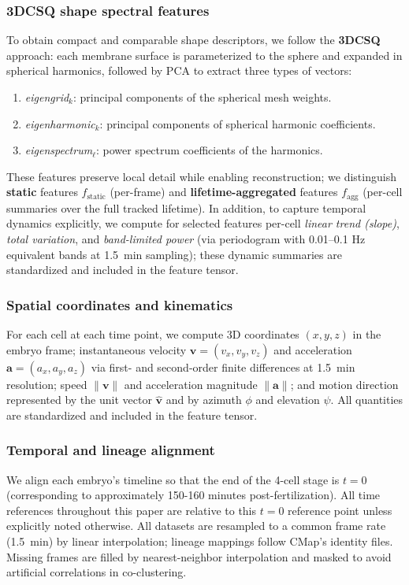 \documentclass[unnumsec,webpdf,modern,large,namedate]{oup-authoring-template}%
\theoremstyle{thmstyleone}\newtheorem{theorem}{Theorem}
\theoremstyle{thmstyletwo}\newtheorem{example}{Example}
\theoremstyle{thmstylethree}\newtheorem{definition}{Definition}
\begin{document}
\subsubsection{3DCSQ shape spectral features}
To obtain compact and comparable shape descriptors, we follow the \textbf{3DCSQ} approach: each membrane surface is parameterized to the sphere and expanded in spherical harmonics, followed by PCA to extract three types of vectors:
\begin{enumerate}
    \item \textit{eigengrid}$_k$: principal components of the spherical mesh weights.
    \item \textit{eigenharmonic}$_k$: principal components of spherical harmonic coefficients.
    \item \textit{eigenspectrum}$_\ell$: power spectrum coefficients of the harmonics.
\end{enumerate}
These features preserve local detail while enabling reconstruction; we distinguish \textbf{static} features $f_{\text{static}}$ (per-frame) and \textbf{lifetime-aggregated} features $f_{\text{agg}}$ (per-cell summaries over the full tracked lifetime).  In addition, to capture temporal dynamics explicitly, we compute for selected features per-cell \emph{linear trend (slope)}, \emph{total variation}, and \emph{band-limited power} (via periodogram with 0.01--0.1 Hz equivalent bands at 1.5~min sampling); these dynamic summaries are standardized and included in the feature tensor.

\subsubsection{Spatial coordinates and kinematics}
For each cell at each time point, we compute 3D coordinates $(x,y,z)$ in the embryo frame; instantaneous velocity $\mathbf v=(v_x,v_y,v_z)$ and acceleration $\mathbf a=(a_x,a_y,a_z)$ via first- and second-order finite differences at 1.5~min resolution; speed $\|\mathbf v\|$ and acceleration magnitude $\|\mathbf a\|$; and motion direction represented by the unit vector $\hat{\mathbf v}$ and by azimuth $\phi$ and elevation $\psi$. All quantities are standardized and included in the feature tensor.

\subsubsection{Temporal and lineage alignment}
We align each embryo's timeline so that the end of the 4-cell stage is $t=0$ (corresponding to approximately 150-160 minutes post-fertilization). All time references throughout this paper are relative to this $t=0$ reference point unless explicitly noted otherwise. All datasets are resampled to a common frame rate (1.5~min) by linear interpolation; lineage mappings follow CMap's identity files. Missing frames are filled by nearest-neighbor interpolation and masked to avoid artificial correlations in co-clustering.
\end{document}
